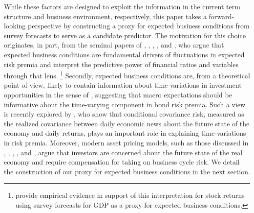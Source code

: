 \documentclass[12pt,letterpaper,leqno,doublespacing]{article}
\begin{document}
While these factors are designed to exploit the information in the current term structure and business environment, respectively, this paper takes a forward-looking perspective by constructing a proxy for expected business conditions from survey forecasts to serve as a candidate predictor. The motivation for this choice originates, in part, from the seminal papers of \cite{ChenRollRoss1986}, \cite{FamaFrench1989}, \cite{Barro1990}, \cite{Fama1990}, and \cite{FersonHarvey1991}, who argue that expected business conditions are fundamental drivers of fluctuations in expected risk premia and interpret the predictive power of financial ratios and variables through that lens.%
\footnote{\cite{CampbellDiebold2009} provide empirical evidence in support of this interpretation for stock returns using survey forecasts for GDP as a proxy for expected business conditions.}
% 
Secondly, expected business conditions are, from a theoretical point of view, likely to contain information about time-variations in investment opportunities in the sense of \cite{Merton1973}, suggesting that macro expectations should be informative about the time-varying component in bond risk premia. Such a view is recently explored by \cite{RossiTimmermann2015}, who show that conditional covariance risk, measured as the realized covariance between daily economic news about the future state of the economy and daily returns, plays an important role in explaining time-variations in risk premia. Moreover, modern asset pricing models, such as those discussed in \cite{CampbellCochrane1999}, \cite{BansalYaron2004}, \cite{Wachter2006}, \cite{BuraschiHiltsov2007}, and \cite{BansalShaliastovich2013}, argue that investors are concerned about the future state of the real economy and require compensation for taking on business cycle risk. We detail the construction of our proxy for expected business conditions in the next section. 

\end{document}
